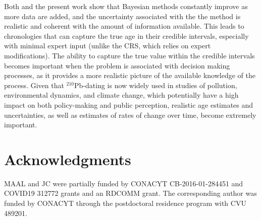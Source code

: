 \documentclass [10pt] {article}
\begin{document}
Both \citet{Blaauw2018} and the present work show that Bayesian methods constantly improve as more data are added, and the uncertainty associated with the the method is realistic and coherent with the amount of information available. 
This leads to chronologies that can capture the true age in their credible intervals, especially with minimal expert input (unlike the CRS, which relies on expert modifications). 
The ability to capture the true value within the credible intervals becomes important when the problem is associated with decision making processes, as it provides a more realistic picture of the available knowledge of the process. 
Given that $^{210}$Pb-dating is now widely used in studies of pollution, environmental dynamics, and climate change, which potentially have a high impact on both policy-making and public perception, realistic age estimates and uncertainties, as well as estimates of rates of change over time, become extremely important.


\section{Acknowledgments}

MAAL and JC were partially funded by CONACYT CB-2016-01-284451 and COVID19 312772 grants and an RDCOMM grant.
The corresponding author was funded by CONACYT through the postdoctoral residence program with CVU  489201.




\newpage




\end{document}
